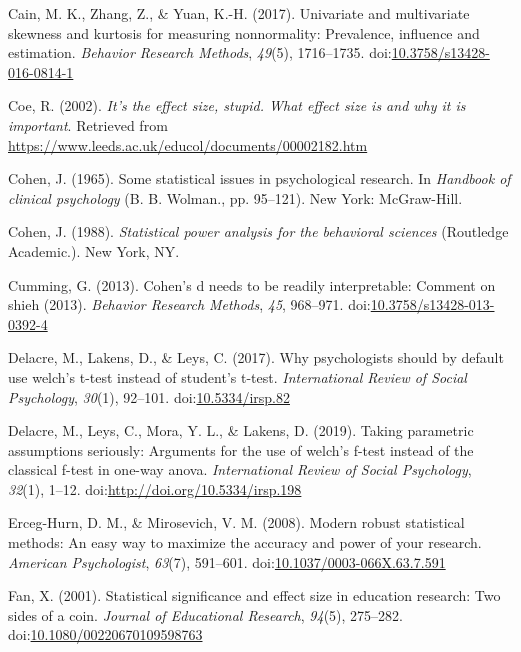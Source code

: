 \documentclass[
  man]{apa6}
\begin{document}
\leavevmode\hypertarget{ref-Cain_et_al_2017}{}%
Cain, M. K., Zhang, Z., \& Yuan, K.-H. (2017). Univariate and multivariate skewness and kurtosis for measuring nonnormality: Prevalence, influence and estimation. \emph{Behavior Research Methods}, \emph{49}(5), 1716--1735. doi:\href{https://doi.org/10.3758/s13428-016-0814-1}{10.3758/s13428-016-0814-1}

\leavevmode\hypertarget{ref-Coe_2002}{}%
Coe, R. (2002). \emph{It's the effect size, stupid. What effect size is and why it is important}. Retrieved from \url{https://www.leeds.ac.uk/educol/documents/00002182.htm}

\leavevmode\hypertarget{ref-Cohen_1965}{}%
Cohen, J. (1965). Some statistical issues in psychological research. In \emph{Handbook of clinical psychology} (B. B. Wolman., pp. 95--121). New York: McGraw-Hill.

\leavevmode\hypertarget{ref-Cohen_1988}{}%
Cohen, J. (1988). \emph{Statistical power analysis for the behavioral sciences} (Routledge Academic.). New York, NY.

\leavevmode\hypertarget{ref-Cumming_2013}{}%
Cumming, G. (2013). Cohen's d needs to be readily interpretable: Comment on shieh (2013). \emph{Behavior Research Methods}, \emph{45}, 968--971. doi:\href{https://doi.org/10.3758/s13428-013-0392-4}{10.3758/s13428-013-0392-4}

\leavevmode\hypertarget{ref-Delacre_et_al_2017}{}%
Delacre, M., Lakens, D., \& Leys, C. (2017). Why psychologists should by default use welch's t-test instead of student's t-test. \emph{International Review of Social Psychology}, \emph{30}(1), 92--101. doi:\href{https://doi.org/10.5334/irsp.82}{10.5334/irsp.82}

\leavevmode\hypertarget{ref-Delacre_et_al_2019}{}%
Delacre, M., Leys, C., Mora, Y. L., \& Lakens, D. (2019). Taking parametric assumptions seriously: Arguments for the use of welch's f-test instead of the classical f-test in one-way anova. \emph{International Review of Social Psychology}, \emph{32}(1), 1--12. doi:\href{https://doi.org/http://doi.org/10.5334/irsp.198}{http://doi.org/10.5334/irsp.198}

\leavevmode\hypertarget{ref-Erceg-Hurn_Mirosevich_2008}{}%
Erceg-Hurn, D. M., \& Mirosevich, V. M. (2008). Modern robust statistical methods: An easy way to maximize the accuracy and power of your research. \emph{American Psychologist}, \emph{63}(7), 591--601. doi:\href{https://doi.org/10.1037/0003-066X.63.7.591}{10.1037/0003-066X.63.7.591}

\leavevmode\hypertarget{ref-Fan_2001}{}%
Fan, X. (2001). Statistical significance and effect size in education research: Two sides of a coin. \emph{Journal of Educational Research}, \emph{94}(5), 275--282. doi:\href{https://doi.org/10.1080/00220670109598763}{10.1080/00220670109598763}
\end{document}
